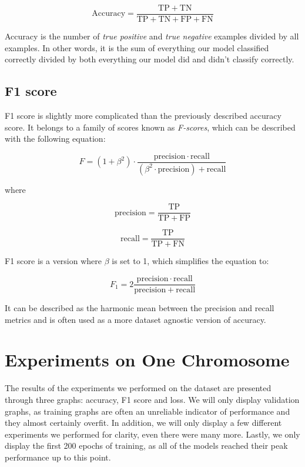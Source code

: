 \documentclass[times, utf8, diplomski, english]{fer_eng}
\begin{document}
\[ \mathrm{Accuracy} = \frac{\mathrm{TP} + \mathrm{TN}}{\mathrm{TP} + \mathrm{TN} + \mathrm{FP} + \mathrm{FN}} \]

Accuracy is the number of \textit{true positive} and \textit{true negative} examples divided by all examples. In other words, it is the sum of everything our model classified correctly divided by both everything our model did and didn't classify correctly.

\subsection{F1 score}

F1 score is slightly more complicated than the previously described accuracy score. It belongs to a family of scores known as \textit{F-scores}, which can be described with the following equation:

\[ F = (1 + \beta^2) \cdot \frac{\mathrm{precision} \cdot \mathrm{recall}}{(\beta^2 \cdot \mathrm{precision}) + \mathrm{recall}} \]

where

\[ \mathrm{precision} = \frac{\mathrm{TP}}{\mathrm{TP} + \mathrm{FP}} \]

\[ \mathrm{recall} = \frac{\mathrm{TP}}{\mathrm{TP} + \mathrm{FN}} \]

F1 score is a version where $\beta$ is set to 1, which simplifies the equation to:

\[ F_1 = 2 \frac{\mathrm{precision} \cdot \mathrm{recall}}{\mathrm{precision} + \mathrm{recall}} \]

It can be described as the harmonic mean between the precision and recall metrics and is often used as a more dataset agnostic version of accuracy.

\section{Experiments on One Chromosome}
\label{sec:experiments on one chromosome}

The results of the experiments we performed on the dataset are presented through three graphs: accuracy, F1 score and loss. We will only display validation graphs, as training graphs are often an unreliable indicator of performance and they almost certainly overfit. In addition, we will only display a few different experiments we performed for clarity, even there were many more. Lastly, we only display the first 200 epochs of training, as all of the models reached their peak performance up to this point.
\end{document}
